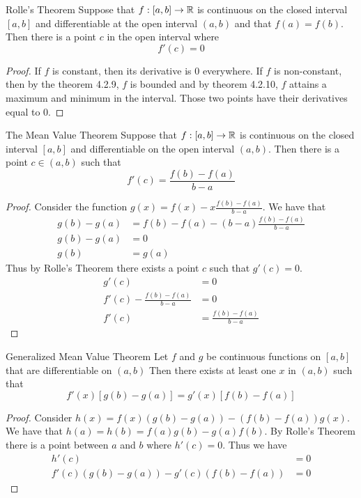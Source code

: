 \documentclass[a4paper]{article}
\begin{document}
\begin{thm}{Rolle's Theorem}{} Suppose that $f:[a,b]\to\mathbb{R}$ is continuous on the closed interval $[a,b]$ and differentiable at the open interval $(a,b)$ and that $f(a)=f(b)$. Then there is a point $c$ in the open interval where $$f'(c)=0$$ \tcbline
\begin{proof} If $f$ is constant, then its derivative is $0$ everywhere. If $f$ is non-constant, then by the theorem 4.2.9, $f$ is bounded and by theorem 4.2.10, $f$ attains a maximum and minimum in the interval. Those two points have their derivatives equal to $0$. 
\end{proof}
\end{thm}

\begin{thm}{The Mean Value Theorem}{} Suppose that $f:[a,b]\to\mathbb{R}$ is continuous on the closed interval $[a,b]$ and differentiable on the open interval $(a,b)$. Then there is a point $c\in(a,b)$ such that $$f'(c)=\frac{f(b)-f(a)}{b-a}$$ \tcbline
\begin{proof} Consider the function $g(x)=f(x)-x\frac{f(b)-f(a)}{b-a}$. We have that 
\begin{align*}
g(b)-g(a)&=f(b)-f(a)-(b-a)\frac{f(b)-f(a)}{b-a}\\
g(b)-g(a)&=0\\
g(b)&=g(a)
\end{align*} Thus by Rolle's Theorem there exists a point $c$ such that $g'(c)=0$. 
\begin{align*}
g'(c)&=0\\
f'(c)-\frac{f(b)-f(a)}{b-a}&=0\\
f'(c)&=\frac{f(b)-f(a)}{b-a}
\end{align*}
\end{proof}
\end{thm}

\begin{thm}{Generalized Mean Value Theorem}{} Let $f$ and $g$ be continuous functions on $[a,b]$ that are differentiable on $(a,b)$ Then there exists at least one $x$ in $(a,b)$ such that $$f'(x)[g(b)-g(a)]=g'(x)[f(b)-f(a)]$$\tcbline
\begin{proof} Consider $h(x)=f(x)(g(b)-g(a))-(f(b)-f(a))g(x)$. We have that $h(a)=h(b)=f(a)g(b)-g(a)f(b)$. By Rolle's Theorem there is a point between $a$ and $b$ where $h'(c)=0$. Thus we have 
\begin{align*}
h'(c)&=0\\
f'(c)(g(b)-g(a))-g'(c)(f(b)-f(a))&=0
\end{align*}
\end{proof}
\end{thm}
\end{document}
